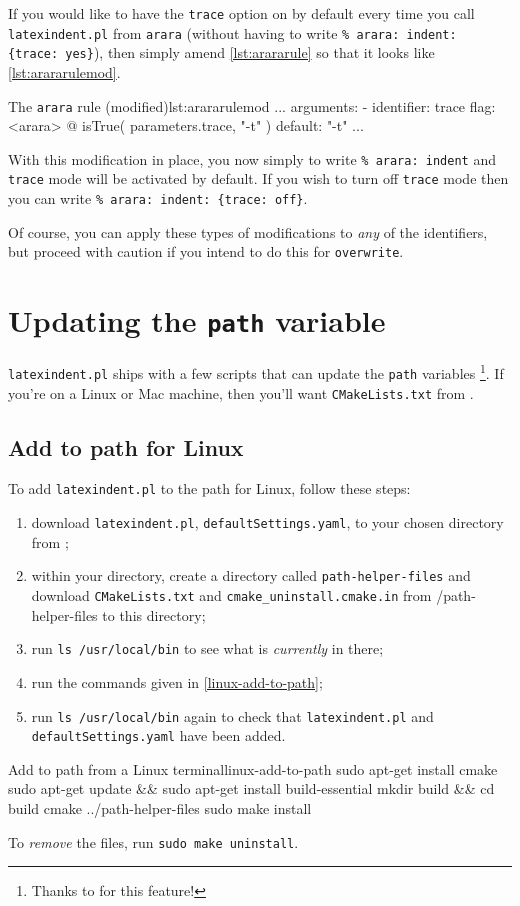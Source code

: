 \documentclass[11pt]{article}
\begin{document}
If you would like to have the \lstinline!trace! option on by default every time you
call \lstinline!latexindent.pl! from \lstinline!arara! (without having to write \lstinline!% arara: indent: {trace: yes}!), then simply
amend \cref{lst:arararule} so that it looks like \cref{lst:arararulemod}.
\begin{cmhlistings}[style=yaml,numbers=none]{The \lstinline!arara! rule (modified)}{lst:arararulemod}
...
arguments:
- identifier: trace
  flag: <arara> @{ isTrue( parameters.trace, "-t" ) }
  default: "-t"
...
\end{cmhlistings}

With this modification in place, you now simply to write \lstinline!% arara: indent! and
\lstinline!trace! mode will be activated by default. If you wish to turn off \lstinline!trace!
mode then you can write \lstinline!% arara: indent: {trace: off}!.

Of course, you can apply these types of modifications to \emph{any} of the identifiers,
but proceed with caution if you intend to do this for \lstinline!overwrite!.

\section{Updating the \lstinline!path! variable}\label{sec:updating-path}
\lstinline!latexindent.pl! ships with a few scripts that can update the \lstinline!path! variables
\footnote{Thanks to \cite{jasjuang} for this feature!}. If you're
on a Linux or Mac machine, then you'll want \lstinline!CMakeLists.txt! from \cite{latexindent-home}.
\subsection{Add to path for Linux}
To add \lstinline!latexindent.pl! to the path for Linux, follow these steps:
\begin{enumerate}
	\item download  \lstinline!latexindent.pl!, \lstinline!defaultSettings.yaml!,  to your
      chosen directory from \cite{latexindent-home} ; 
    \item within your directory, create a directory called \lstinline!path-helper-files! and 
      download \lstinline!CMakeLists.txt! and \lstinline!cmake_uninstall.cmake.in!
	      from \cite{latexindent-home}/path-helper-files to this directory;
	\item run \lstinline!ls /usr/local/bin! to see what is \emph{currently} in there;
	\item run the commands given in \cref{linux-add-to-path};
	\item run \lstinline!ls /usr/local/bin! again to check that \lstinline!latexindent.pl! and \lstinline!defaultSettings.yaml!
	      have been added.
\end{enumerate}
\begin{cmhlistings}[style=yaml,numbers=none]{Add to path from a Linux terminal}{linux-add-to-path}
sudo apt-get install cmake
sudo apt-get update && sudo apt-get install build-essential
mkdir build && cd build
cmake ../path-helper-files
sudo make install
\end{cmhlistings}
To \emph{remove} the files, run \lstinline!sudo make uninstall!.
\end{document}
